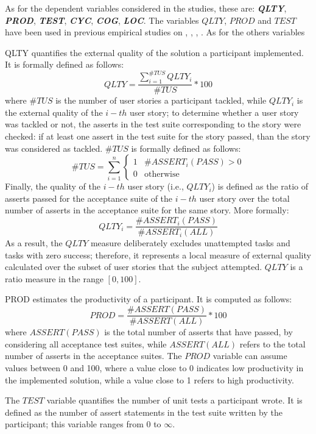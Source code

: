 As for the dependent variables considered in the studies, these are: \textbf{\textit{QLTY}}, \textbf{\textit{PROD}}, \textbf{\textit{TEST}}, \textbf{\textit{CYC}}, \textbf{\textit{COG}}, \textbf{\textit{LOC}}.
The variables $QLTY$, $PROD$ and $TEST$ have been used in previous empirical studies on \noess \cite{DBLP:journals/tse/ErdogmusMT05}, \cite{DBLP:journals/tse/FucciETOJ17}, \cite{DBLP:conf/esem/Fucci0BCSTJ18}, \cite{DBLP:journals/ese/TosunDFVTESOTJJ17}. As for the others variables

QLTY quantifies the external quality of the solution a participant implemented. It is formally defined as follows: 
\[
    QLTY = \frac{\sum_{i=1}^{\#TUS} QLTY_i}{\#TUS} * 100 
\]
where $\#TUS$ is the number of user stories a participant tackled, while $QLTY_i$ is the external quality of the $i-th$ user story; to determine whether a user story was tackled or not, the asserts in the test suite corresponding to the story were checked: if at least one assert in the test suite for the story passed, than the story was considered as tackled. $\#TUS$ is formally defined as follows:
\[
    \#TUS = \sum_{i=1}^{n} 
        \begin{cases}
            1 & \text{$\#ASSERT_i(PASS) > 0$}\\
                0 & \text{otherwise}
        \end{cases}
\]
Finally, the quality of the $i-th$ user story (i.e., $QLTY_i$) is defined as the ratio of asserts passed for the acceptance suite of the $i-th$ user story over the total number of asserts in the acceptance suite for the same story. More formally:
\[
    QLTY_i = \frac{\#ASSERT_i(PASS)}{\#ASSERT_i(ALL)}
\]
As a result, the $QLTY$ measure deliberately excludes unattempted tasks and tasks with zero success; therefore, it represents a local measure of external quality calculated over the subset of user stories that the subject attempted. $QLTY$ is a ratio measure in the range $[0, 100]$.

PROD estimates the productivity of a participant. It is computed as follows:
\[
    PROD = \frac{\#ASSERT(PASS)}{\#ASSERT(ALL)} * 100
\]
where $ASSERT(PASS)$ is the total number of asserts that have passed, by considering all acceptance test suites, while $ASSERT(ALL)$ refers to the total number of asserts in the acceptance suites. The $PROD$ variable can assume values between 0 and 100, where a value close to 0 indicates low productivity in the implemented solution, while a value close to 1 refers to high productivity.

The $TEST$ variable quantifies the number of unit tests a participant wrote. It is defined as the number of assert statements in the test suite written by the participant; this variable ranges from 0 to $\infty$.


